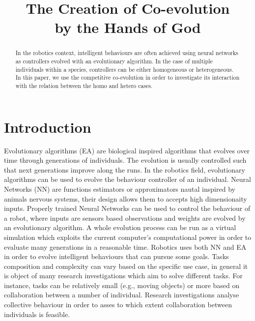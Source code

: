 \documentclass[conference]{IEEEtran}
\begin{document}
\title{The Creation of Co-evolution \\ by the Hands of God}



\author{
}



\maketitle


\begin{abstract}
In the robotics context, intelligent behaviours are often achieved using neural networks as controllers evolved with an evolutionary algorithm.
In the case of multiple individuals within a species, controllers can be either homogeneous or heterogeneous.
In this paper, we use the competitive co-evolution in order to investigate its interaction with the relation between the homo and hetero cases.
\end{abstract}


\IEEEpeerreviewmaketitle


\section{Introduction}
Evolutionary algorithms (EA) are biological inspired algorithms that evolves over time through generations of individuals. 
The evolution is usually controlled such that next generations improve along the runs.
In the robotics field, evolutionary algorithms can be used to evolve the  behaviour controller of an individual.
Neural Networks (NN) are functions estimators or approximators nautal inspired by animals nervous systems, their design allows them to accepts high dimensionaity inputs.   
Properly trained Neural Networks can be used to control the behaviour of a robot, where inputs are sensors based observations and weights are evolved by an evolutionary algorithm.
A whole evolution process can be run as a virtual simulation which exploits the current computer's computational power in order to evaluate many generations in a reasonable time.
Robotics uses both NN and EA in order to evolve intelligent behaviours that can pursue some goals.
Tasks composition and complexity can vary based on the specific use case, in general it is object of many research investigations which aim to solve different tasks.
For instance, tasks can be relatively small (e.g., moving objects) or more based on collaboration between a number of individual.
Research investigations analyse collective behaviour in order to asses to which extent collaboration between individuals is feasible.  
\end{document}
